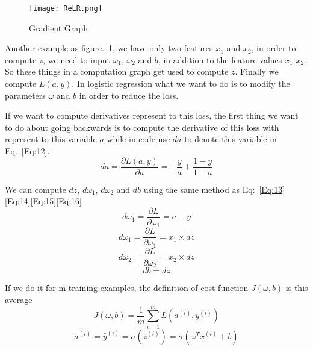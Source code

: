 \documentclass[a4paper]{article}
\begin{document}
\begin{figure}[!htp]
\begin{center}
   \texttt{[image: ReLR.png]}
\end{center}
   \caption{Gradient Graph}
\label{fig:ReLR}
\end{figure}

Another example as figure.~\ref{fig:ReLR}, we have only two features $x_1$ and $x_2$, in order to compute $z$, we need to input $\omega_1$, $\omega_2$ and $b$, in addition to the feature values $x_1$ $x_2$. So these things in a computation graph get used to compute $z$. Finally we compute $L(a,y)$. In logistic regression what we want to do is to modify the parameters $\omega$ and $b$ in order to reduce the loss.\par
If we want to compute derivatives represent to this loss, the first thing we want to do about going backwards is to compute the derivative of this loss with  represent to this variable $a$ while in code use $da$ to denote this variable in Eq.~\ref{Eq:12}. 
\begin{equation}
da=\frac{\partial L(a,y)}{\partial a}=-\frac{y}{a}+\frac{1-y}{1-a}
\label{Eq:12}
\end{equation}\par
We can compute $d z$, $d \omega_1$, $d \omega_2$ and $d b$ using the same method as Eq:~\ref{Eq:13}\ref{Eq:14}\ref{Eq:15}\ref{Eq:16}
\begin{equation}
d \omega_1=\frac{\partial L}{\partial \omega_1}=a-y
\label{Eq:13}
\end{equation}
\begin{equation}
d \omega_1=\frac{\partial L}{\partial \omega_1}=x_1 \times dz
\label{Eq:14}
\end{equation}
\begin{equation}
d \omega_2=\frac{\partial L}{\partial \omega_2}=x_2 \times dz
\label{Eq:15}
\end{equation}
\begin{equation}
db=dz
\label{Eq:16}
\end{equation}\par
If we do it for m training examples, the definition of cost function $J(\omega,b)$ is this average 
\begin{equation}
J(\omega,b)=\frac{1}{m}\sum_{i=1}^m L(a^{(i)},y^{(i)})
\label{Eq:17}
\end{equation}
\begin{equation}
a^{(i)}=\hat{y}^{(i)}=\sigma(z^{(i)})=\sigma(\omega^Tx^{(i)}+b)
\label{Eq:18}
\end{equation}\par
\end{document}
